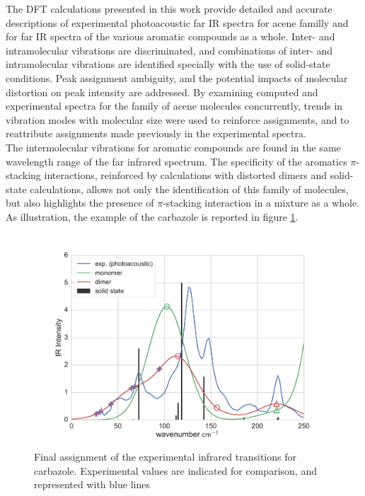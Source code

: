 The DFT calculations presented in this work provide detailed and accurate descriptions of experimental photoacoustic far IR spectra for acene familly and for far IR spectra of the various aromatic compounds as a whole. Inter- and intramolecular vibrations are discriminated, and combinations of inter- and intramolecular vibrations are identified specially with the use of solid-state conditions. Peak assignment ambiguity, and the potential impacts of molecular distortion on peak intensity are addressed. By examining computed and experimental spectra for the family of acene molecules concurrently, trends in vibration modes with molecular size were used to reinforce assignments, and to reattribute assignments made previously in the experimental spectra.\\

The intermolecular vibrations for aromatic compounds are found in the same wavelength range of the far infrared spectrum. The specificity of the aromatics $\pi$-stacking interactions, reinforced by calculations with distorted dimers and solid-state calculations, allows not only the identification of this family of molecules, but also highlights the presence of $\pi$-stacking interaction in a mixture as a whole. As illustration, the example of the carbazole is reported in figure \ref{figure666}.\\

 \begin{figure}[H]
 	\centering
 	\includegraphics[scale=0.3]{image/carbazole_markers}
 	\caption{Final assignment of the experimental infrared transitions for carbazole. Experimental values are indicated for comparison, and represented with blue lines} \label{figure666}
 \end{figure}

